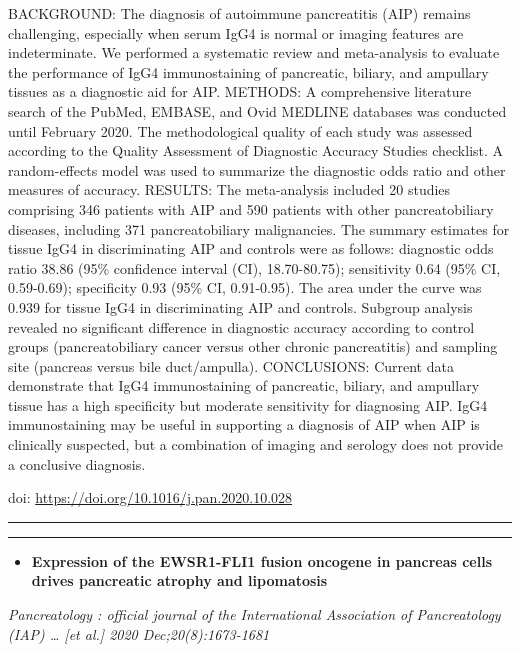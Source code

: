 \documentclass[
]{article}
\providecommand{\tightlist}{%
  \setlength{\itemsep}{0pt}\setlength{\parskip}{0pt}}
\begin{document}
BACKGROUND: The diagnosis of autoimmune pancreatitis (AIP) remains
challenging, especially when serum IgG4 is normal or imaging features
are indeterminate. We performed a systematic review and meta-analysis to
evaluate the performance of IgG4 immunostaining of pancreatic, biliary,
and ampullary tissues as a diagnostic aid for AIP. METHODS: A
comprehensive literature search of the PubMed, EMBASE, and Ovid MEDLINE
databases was conducted until February 2020. The methodological quality
of each study was assessed according to the Quality Assessment of
Diagnostic Accuracy Studies checklist. A random-effects model was used
to summarize the diagnostic odds ratio and other measures of accuracy.
RESULTS: The meta-analysis included 20 studies comprising 346 patients
with AIP and 590 patients with other pancreatobiliary diseases,
including 371 pancreatobiliary malignancies. The summary estimates for
tissue IgG4 in discriminating AIP and controls were as follows:
diagnostic odds ratio 38.86 (95\% confidence interval (CI),
18.70-80.75); sensitivity 0.64 (95\% CI, 0.59-0.69); specificity 0.93
(95\% CI, 0.91-0.95). The area under the curve was 0.939 for tissue IgG4
in discriminating AIP and controls. Subgroup analysis revealed no
significant difference in diagnostic accuracy according to control
groups (pancreatobiliary cancer versus other chronic pancreatitis) and
sampling site (pancreas versus bile duct/ampulla). CONCLUSIONS: Current
data demonstrate that IgG4 immunostaining of pancreatic, biliary, and
ampullary tissue has a high specificity but moderate sensitivity for
diagnosing AIP. IgG4 immunostaining may be useful in supporting a
diagnosis of AIP when AIP is clinically suspected, but a combination of
imaging and serology does not provide a conclusive diagnosis.

doi: \url{https://doi.org/10.1016/j.pan.2020.10.028}

\begin{center}\rule{0.5\linewidth}{0.5pt}\end{center}

\begin{center}\rule{0.5\linewidth}{0.5pt}\end{center}

\begin{itemize}
\tightlist
\item
  \textbf{Expression of the EWSR1-FLI1 fusion oncogene in pancreas cells
  drives pancreatic atrophy and lipomatosis}
\end{itemize}

\emph{Pancreatology : official journal of the International Association
of Pancreatology (IAP) \ldots{} {[}et al.{]} 2020 Dec;20(8):1673-1681}
\end{document}
